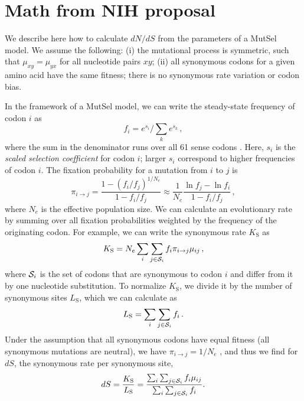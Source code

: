 \documentclass[11pt]{article}
\begin{document}
\section*{Math from NIH proposal}
	
We describe here how to calculate $dN/dS$ from the parameters of a MutSel model. We assume the following: (i) the mutational process is symmetric, such that $\mu_{xy}=\mu_{yx}$ for all nucleotide pairs $xy$; (ii) all synonymous codons for a given amino acid have the same fitness; there is no synonymous rate variation or codon bias.

In the framework of a MutSel model, we can write the steady-state frequency of codon $i$ as
\begin{equation}\label{eq:fi}
 f_i=e^{s_i}\Big/\sum_k e^{s_k}\,,
\end{equation}
where the sum in the denominator runs over all 61 sense codons \cite{SellaHirsh2005}. Here, $s_i$ is the \emph{scaled selection coefficient} for codon $i$; larger $s_i$ correspond to higher frequencies of codon $i$. The fixation probability for a mutation from $i$ to $j$ is \cite{HalpernBruno1998,SellaHirsh2005}
\begin{equation}
  \pi_{i\rightarrow j} = \frac{1-(f_i/f_j)^{1/N_e}}{1-f_i/f_j}
  \approx \frac{1}{N_e} \frac{\ln f_j - \ln f_i}{1-f_i/f_j}\,,
\end{equation}
where $N_e$ is the effective population size. We can calculate an evolutionary rate by summing over all fixation probabilities weighted by the frequency of the originating codon. For example, we can write the synonymous rate $K_\text{S}$ as
\begin{equation}\label{eq:KS}
  K_\text{S} = N_e \sum_i \sum_{j \in {\cal S}_i} f_i  \pi_{i\rightarrow j}\mu_{ij}\,,
\end{equation}
where ${\cal S}_i$ is the set of codons that are synonymous to codon $i$ and differ from it by one nucleotide substitution. To normalize $K_\text{S}$, we divide it by the number of synonymous sites $L_\text{S}$, which we can calculate as 
\begin{equation}\label{eq:LS}
  L_\text{S} = \sum_i \sum_{j \in {\cal S}_i} f_i \,.
\end{equation}
Under the assumption that all synonymous codons have equal fitness (all synonymous mutations are neutral), we have $\pi_{i\rightarrow j}=1/N_e$ \cite{CrowKimura1970}, and thus we find for $dS$, the synonymous rate per synonymous site,
\begin{equation}\label{eq:dS}
  dS = \frac{K_\text{S}}{L_\text{S}}= \frac{\sum_i \sum_{j \in {\cal S}_i} f_i\mu_{ij}}{\sum_i \sum_{j \in {\cal S}_i} f_i}.
\end{equation}
\end{document}
